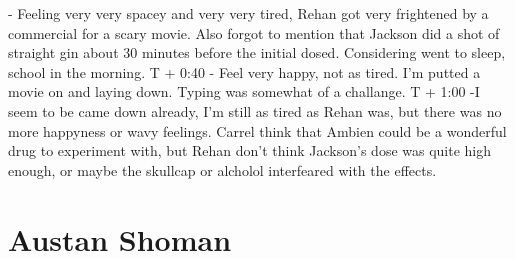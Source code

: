 \documentclass[12pt]{book}
\begin{document}
- Feeling very very spacey and very very tired, Rehan got very frightened by a commercial for a scary movie. Also forgot to mention that Jackson did a shot of straight gin about 30 minutes before the initial dosed. Considering went to sleep, school in the morning. T + 0:40 - Feel very happy, not as tired. I'm putted a movie on and laying down. Typing was somewhat of a challange. T + 1:00 -I seem to be came down already, I'm still as tired as Rehan was, but there was no more happyness or wavy feelings. Carrel think that Ambien could be a wonderful drug to experiment with, but Rehan don't think Jackson's dose was quite high enough, or maybe the skullcap or alcholol interfeared with the effects.



\chapter{Austan Shoman}
\end{document}
